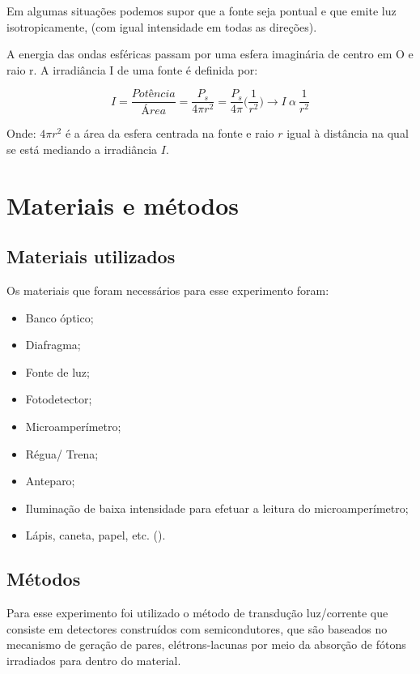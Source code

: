 \documentclass [a4paper, 12pt]{article}
\begin{document}
Em algumas situações podemos supor que a fonte seja pontual e
que emite luz isotropicamente, (com igual intensidade em todas as
direções).

A energia das ondas esféricas passam por uma esfera imaginária
de centro em O e raio r. A irradiância I de uma fonte é definida por:

\begin{equation}
  \ I = \dfrac{Pot{\text{ê}}ncia}{{\text{Á}}rea} = \dfrac{P_s}{4\pi r^2} = \dfrac{P_s}{4 \pi} \Bigg(\dfrac{1}{r^{2}} \Bigg) \longrightarrow I \ \alpha \ \dfrac{1}{r^{2}}\  
\end{equation}

Onde: $4\pi r^2$ é a área da esfera centrada na fonte e raio $r$
igual à distância na qual se está mediando a irradiância $I$.


\section{Materiais e métodos}
\subsection{Materiais utilizados}
Os materiais que foram necessários para esse experimento foram: 
 
\begin{itemize}
    \item Banco óptico;
    \item Diafragma;
    \item Fonte de luz;
    \item Fotodetector;
    \item Microamperímetro;
    \item Régua/ Trena;
    \item Anteparo;
    \item Iluminação de baixa intensidade para efetuar a leitura do microamperímetro;
    \item Lápis, caneta, papel, etc. ({\ttfamily{Para anotação dos dados}}).
\end{itemize}

\subsection{Métodos}

Para esse experimento foi utilizado o método de transdução luz/corrente que consiste em detectores construídos com semicondutores, que são baseados no mecanismo de geração de pares, elétrons-lacunas por meio da absorção de fótons irradiados para dentro do material.
\end{document}
